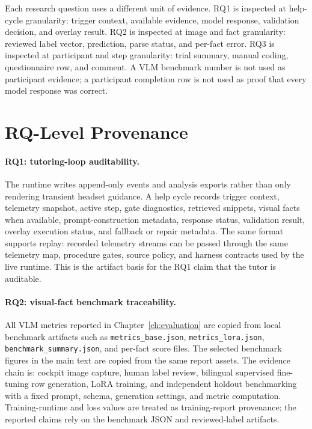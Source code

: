 Each research question uses a different unit of evidence. RQ1 is inspected at
help-cycle granularity: trigger context, available evidence, model response,
validation decision, and overlay result. RQ2 is inspected at image and fact
granularity: reviewed label vector, prediction, parse status, and per-fact
error. RQ3 is inspected at participant and step granularity: trial summary,
manual coding, questionnaire row, and comment. A VLM benchmark number is not
used as participant evidence; a participant completion row is not used as proof
that every model response was correct.

\section{RQ-Level Provenance}\label{sec:impl-provenance}

\paragraph{RQ1: tutoring-loop auditability.}
The runtime writes append-only events and analysis exports rather than only
rendering transient headset guidance. A help cycle records trigger context,
telemetry snapshot, active step, gate diagnostics, retrieved snippets, visual
facts when available, prompt-construction metadata, response status, validation
result, overlay execution status, and fallback or repair metadata. The same
format supports replay: recorded telemetry streams can be passed through the
same telemetry map, procedure gates, source policy, and harness contracts used
by the live runtime. This is the artifact basis for the RQ1 claim that the
tutor is auditable.

\paragraph{RQ2: visual-fact benchmark traceability.}
All VLM metrics reported in Chapter~\ref{ch:evaluation} are copied from local
benchmark artifacts such as \texttt{metrics\_base.json},
\texttt{metrics\_lora.json}, \texttt{benchmark\_summary.json}, and per-fact
score files. The selected benchmark figures in the main text are copied from
the same report assets. The evidence chain is: cockpit image capture, human
label review, bilingual supervised fine-tuning row generation, LoRA training,
and independent holdout benchmarking with a fixed prompt, schema, generation
settings, and metric computation. Training-runtime and loss values are treated
as training-report provenance; the reported claims rely on the benchmark JSON and
reviewed-label artifacts.

